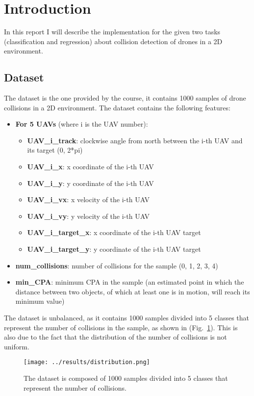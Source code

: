 \section{Introduction}
In this report I will describe the implementation for the given two tasks (classification and regression) about collision detection of drones in a 2D environment.

\subsection{Dataset}
The dataset is the one provided by the course, it contains 1000 samples of drone collisions in a 2D environment. The dataset contains the following features:
\begin{itemize}
    \item \textbf{For 5 UAVs} (where i is the UAV number):
    \begin{itemize}
        \item \textbf{UAV\_i\_track}: clockwise angle from north between the i-th UAV and its target (0, 2*pi)
        \item \textbf{UAV\_i\_x}: x coordinate of the i-th UAV
        \item \textbf{UAV\_i\_y}: y coordinate of the i-th UAV
        \item \textbf{UAV\_i\_vx}: x velocity of the i-th UAV
        \item \textbf{UAV\_i\_vy}: y velocity of the i-th UAV
        \item \textbf{UAV\_i\_target\_x}: x coordinate of the i-th UAV target
        \item \textbf{UAV\_i\_target\_y}: y coordinate of the i-th UAV target
    \end{itemize}
    \item \textbf{num\_collisions}: number of collisions for the sample (0, 1, 2, 3, 4)
    \item \textbf{min\_CPA}: minimum CPA in the sample (an estimated point in which the distance between two objects, of which at least one is in motion, will reach its minimum value)
\end{itemize}
The dataset is unbalanced, as it contains 1000 samples divided into 5 classes that represent the number of collisions in the sample, as shown in (Fig.~\ref{fig:dataset_distribution}).
This is also due to the fact that the distribution of the number of collisions is not uniform.

\begin{figure}
    \centering
    \texttt{[image: ../results/distribution.png]}
    \caption{The dataset is composed of 1000 samples divided into 5 classes that represent the number of collisions.}
    \label{fig:dataset_distribution}
\end{figure}


